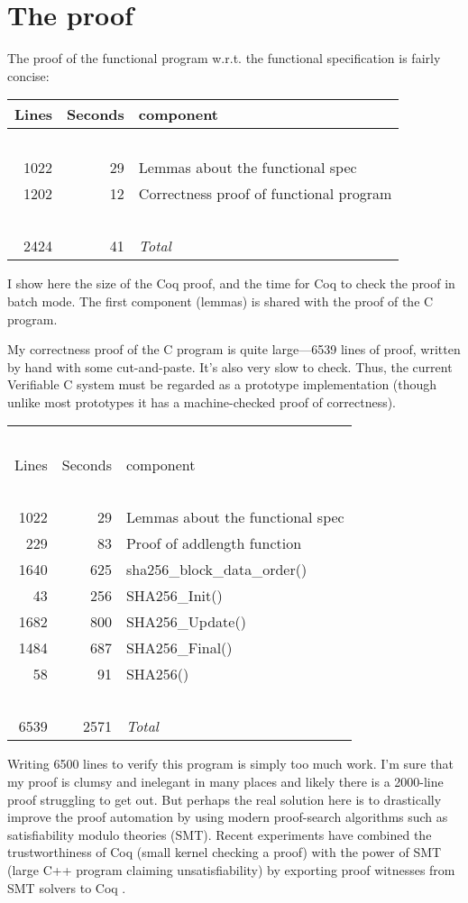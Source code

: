 \documentclass[prodmode,acmtoplas]{acmsmall}
\begin{document}
\section{The proof}
\label{sec:proof}
The proof of the functional program w.r.t. the functional
specification is fairly concise:

\noindent \begin{tabular}{rr p{4in}}
Lines & Seconds & component \\ \hline
~\\[-2ex]
1022 & 29 & Lemmas about the functional spec \\
1202 & 12 & Correctness proof of functional program \\ \hline
~\\[-2ex]
2424 & 41 & \emph{Total}\\ [2ex]
\end{tabular}

\noindent
I show here the size of the Coq proof, and the
time for Coq to check the proof in batch mode.
The first component (lemmas) is shared with
the proof of the C program.

My correctness proof of the C program
is quite large---6539 lines of proof, written by hand
with some cut-and-paste.
It's also very slow to check.  Thus, the current
Verifiable C system must be regarded as a prototype implementation
(though unlike most prototypes it has a machine-checked proof
of correctness).

\noindent \begin{tabular}{rr p{4in}}
~\\[-1ex]
Lines & Seconds & component \\ \hline
~\\[-2ex]
1022 & 29 & Lemmas about the functional spec \\
229 & 83 & Proof of addlength function \\
1640 & 625 & sha256\_block\_data\_order()\\
43 & 256 & SHA256\_Init() \\
1682 & 800 & SHA256\_Update() \\
1484 & 687 & SHA256\_Final() \\
58 & 91 & SHA256() \\ \hline
~\\[-2ex]
6539 & 2571 & \emph{Total}\\ [2ex]
\end{tabular}

Writing 6500 lines to verify this program is simply too much work.
I'm sure that my proof is clumsy and inelegant in many places
and likely there is a 2000-line proof struggling to get out.
But perhaps the real solution here is to drastically improve the
proof automation by using modern proof-search algorithms
such as satisfiability modulo theories (SMT).
Recent experiments have combined the trustworthiness of Coq
(small kernel checking a proof)
with the power of SMT (large C++ program claiming unsatisfiability)
by exporting proof witnesses from SMT solvers to Coq
\cite{besson11,armand11}.
\end{document}
